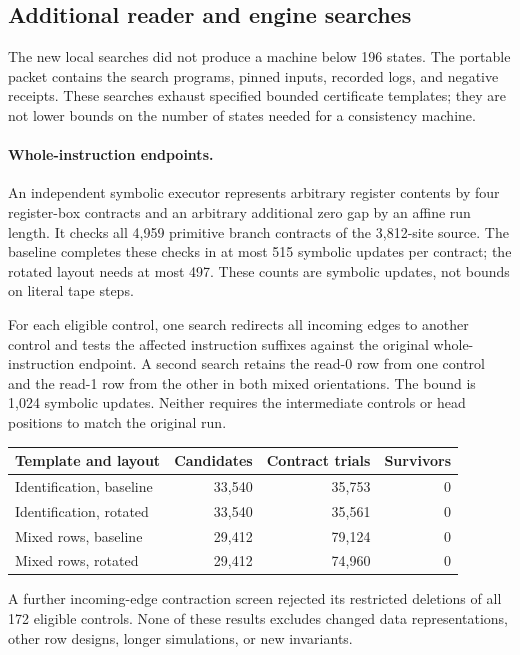 \subsection{Additional reader and engine searches}

The new local searches did not produce a machine below 196 states.
The portable packet  contains the search programs,
pinned inputs, recorded logs, and negative receipts. These searches
exhaust specified bounded certificate templates; they are not lower
bounds on the number of states needed for a consistency machine.

\paragraph{Whole-instruction endpoints.}
An independent symbolic executor represents arbitrary register contents by
four register-box contracts and an arbitrary additional zero gap by an
affine run length. It checks all 4,959 primitive branch contracts of the
3,812-site source. The baseline completes these checks in at most 515
symbolic updates per contract; the rotated layout needs at most 497.
These counts are symbolic updates, not bounds on literal tape steps.

For each eligible control, one search redirects all incoming edges to
another control and tests the affected instruction suffixes against the
original whole-instruction endpoint. A second search retains the read-0
row from one control and the read-1 row from the other in both mixed
orientations. The bound is 1,024 symbolic updates. Neither requires the
intermediate controls or head positions to match the original run.
\begin{center}
\small
\begin{tabular}{@{}lrrr@{}}
\toprule
Template and layout & Candidates & Contract trials & Survivors\\
\midrule
Identification, baseline & 33,540 & 35,753 & 0\\
Identification, rotated & 33,540 & 35,561 & 0\\
Mixed rows, baseline & 29,412 & 79,124 & 0\\
Mixed rows, rotated & 29,412 & 74,960 & 0\\
\bottomrule
\end{tabular}
\end{center}
A further incoming-edge contraction screen rejected its restricted
deletions of all 172 eligible controls. None of these results excludes
changed data representations, other row designs, longer simulations, or
new invariants.

